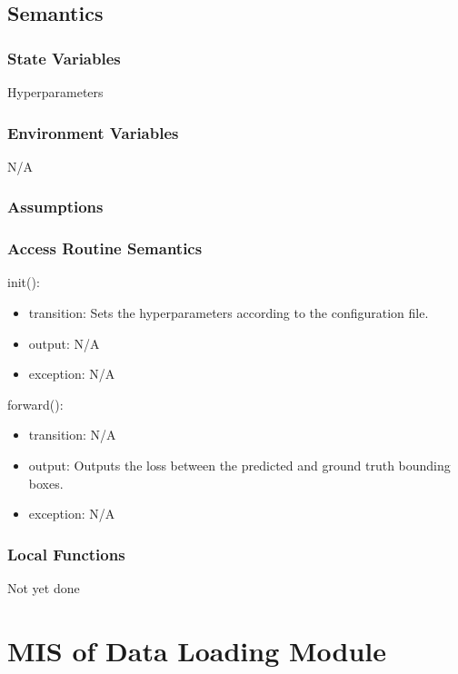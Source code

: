 \documentclass[12pt, titlepage]{article}
\begin{document}
\subsection{Semantics}

\subsubsection{State Variables}

Hyperparameters

\subsubsection{Environment Variables}

N/A

\subsubsection{Assumptions}



\subsubsection{Access Routine Semantics}


\noindent init():
\begin{itemize}
\item transition: Sets the hyperparameters according to the configuration file.
\item output: N/A
\item exception: N/A
\end{itemize}

\noindent forward():
\begin{itemize}
\item transition: N/A
\item output: Outputs the loss between the predicted and ground truth bounding boxes.
\item exception: N/A
\end{itemize}

\subsubsection{Local Functions}

Not yet done

\newpage

\section{MIS of Data Loading Module} \label{Module} 
\end{document}
